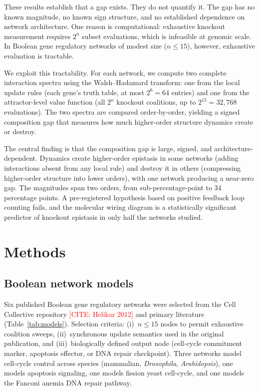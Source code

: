 \documentclass[11pt]{article}
\newcommand{\citeneeded}[1]{\textcolor{red}{[CITE: #1]}}
\begin{document}
These results establish that a gap exists. They do not quantify it.
The gap has no known magnitude, no known sign structure, and no
established dependence on network architecture. One reason is
computational: exhaustive knockout measurement requires $2^n$ subset
evaluations, which is infeasible at genomic scale. In Boolean gene
regulatory networks of modest size ($n \leq 15$), however, exhaustive
evaluation is tractable.

We exploit this tractability. For each network, we compute two
complete interaction spectra using the Walsh--Hadamard transform: one
from the local update rules (each gene's truth table, at most $2^6 =
64$ entries) and one from the attractor-level value function (all
$2^n$ knockout coalitions, up to $2^{15} = 32{,}768$ evaluations).
The two spectra are compared order-by-order, yielding a signed
composition gap that measures how much higher-order structure dynamics
create or destroy.

The central finding is that the composition gap is large, signed, and
architecture-dependent. Dynamics create higher-order epistasis in some
networks (adding interactions absent from any local rule) and destroy
it in others (compressing higher-order structure into lower orders),
with one network producing a near-zero gap. The magnitudes span two
orders, from sub-percentage-point to 34 percentage points.
A pre-registered hypothesis based on positive feedback loop
counting fails, and the molecular wiring diagram is a statistically
significant predictor of knockout epistasis in only half the networks
studied.


\section{Methods}
\label{sec:methods}

\subsection{Boolean network models}
\label{sec:models}

Six published Boolean gene regulatory networks were selected from the
Cell Collective repository \citeneeded{Helikar 2012} and primary
literature (Table~\ref{tab:models}). Selection criteria: (i)~$n \leq
15$ nodes to permit exhaustive coalition sweeps, (ii)~synchronous
update semantics used in the original publication, and
(iii)~biologically defined output node (cell-cycle commitment marker,
apoptosis effector, or DNA repair checkpoint). Three networks model
cell-cycle control across species (mammalian, \emph{Drosophila},
\emph{Arabidopsis}), one models apoptosis signaling, one models
fission yeast cell-cycle, and one models the Fanconi anemia DNA
repair pathway.
\end{document}
